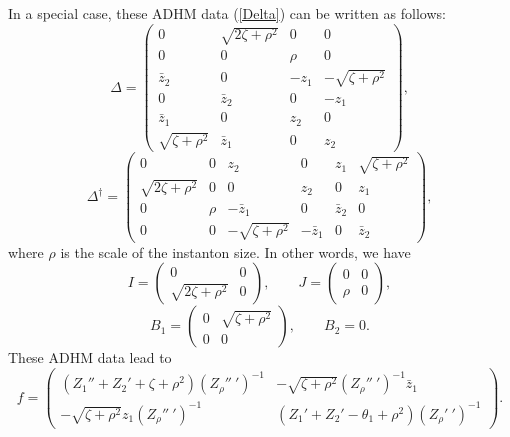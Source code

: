 \documentclass[a4paper,a4paper]{article}
\begin{document}
In a special case, these ADHM data (\ref{Delta}) can be written as
follows:
\begin{equation}
\Delta=\left(\begin{array}{cccc} 0 &\sqrt{2\zeta+\rho^2}& 0 & 0\\
0 & 0 & \rho & 0\\
\bar z_2 & 0 & -z_1 & -\sqrt{\zeta+\rho^2}\\
0 & \bar z_2 & 0 & -z_1\\
\bar z_1 & 0 & z_2 & 0\\
\sqrt{\zeta+\rho^2}&\bar z_1 & 0 & z_2 \end{array}\right),
\end{equation}
\begin{equation}
\Delta^\dag=\left(\begin{array}{cccccc} 0 & 0 & z_2 & 0 & z_1 &
\sqrt{\zeta+\rho^2}\\
\sqrt{2\zeta+\rho^2} & 0 & 0 & z_2 & 0 & z_1\\
0 & \rho & -\bar z_1 & 0 & \bar z_2 & 0\\
0 & 0 & -\sqrt{\zeta+\rho^2}& -\bar z_1 & 0 &\bar z_2
\end{array}\right),
\end{equation}
where $\rho$ is the scale of the instanton size. In other words,
we have
\begin{equation}
I=\left(\begin{array}{cc} 0 & 0 \\ \sqrt{2\zeta+\rho^2} & 0
\end{array}\right),
\qquad J=\left(\begin{array}{cc} 0 & 0 \\ \rho & 0
\end{array}\right),
\end{equation}
\begin{equation}
B_1=\left(\begin{array}{cc} 0 & \sqrt{\zeta+\rho^2} \\ 0 & 0
\end{array}\right),
\qquad B_2=0.
\end{equation}
These ADHM data lead to
\begin{equation}
f=\left(\begin{array}{cc}
(Z_1''+Z_2'+\zeta+\rho^2)(Z_\rho''~')^{-1}
& -\sqrt{\zeta+\rho^2}(Z_\rho''~')^{-1}\bar z_1\\
-\sqrt{\zeta+\rho^2}z_1(Z_\rho''~')^{-1}&
(Z_1'+Z_2'-\theta_1+\rho^2)(Z_\rho'~')^{-1}
\end{array}\right).
\end{equation}
\end{document}
